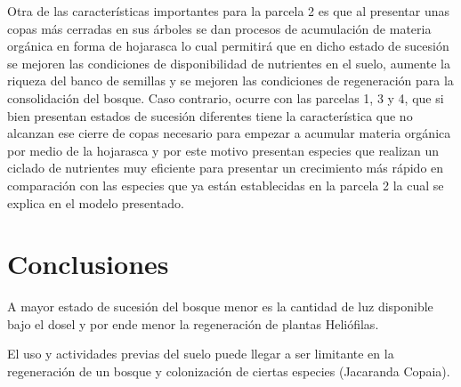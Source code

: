 \documentclass[letterpaper,9pt,twocolumn,twoside,]{pinp}
\begin{document}
Otra de las características importantes para la parcela 2 es que al
presentar unas copas más cerradas en sus árboles se dan procesos de
acumulación de materia orgánica en forma de hojarasca lo cual permitirá
que en dicho estado de sucesión se mejoren las condiciones de
disponibilidad de nutrientes en el suelo, aumente la riqueza del banco
de semillas y se mejoren las condiciones de regeneración para la
consolidación del bosque. Caso contrario, ocurre con las parcelas 1, 3 y
4, que si bien presentan estados de sucesión diferentes tiene la
característica que no alcanzan ese cierre de copas necesario para
empezar a acumular materia orgánica por medio de la hojarasca y por este
motivo presentan especies que realizan un ciclado de nutrientes muy
eficiente para presentar un crecimiento más rápido en comparación con
las especies que ya están establecidas en la parcela 2 la cual se
explica en el modelo presentado.

\hypertarget{conclusiones}{%
\section{Conclusiones}\label{conclusiones}}

A mayor estado de sucesión del bosque menor es la cantidad de luz
disponible bajo el dosel y por ende menor la regeneración de plantas
Heliófilas.

El uso y actividades previas del suelo puede llegar a ser limitante en
la regeneración de un bosque y colonización de ciertas especies
(Jacaranda Copaia).





\end{document}
